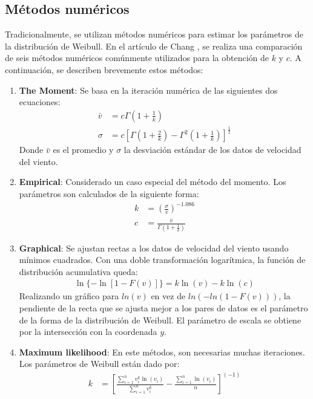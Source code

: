  \subsection{Métodos numéricos}
 Tradicionalmente, se utilizan métodos numéricos para estimar los parámetros de la distribución de Weibull. En el artículo de Chang \cite{Chang10}, se realiza una comparación de seis métodos numéricos comúnmente utilizados para la obtención de $k$ y $c$. A continuación, se describen brevemente estos métodos:
 \begin{enumerate}
     \item \textbf{The Moment}: Se basa en la iteración numérica de las siguientes dos ecuaciones:
        \begin{align}
            \bar{v} &= c\Gamma(1 + \frac{1}{k})\\
            \sigma &= c[\Gamma(1 + \frac{2}{k}) - \Gamma^2(1 + \frac{1}{k})]^{\frac{1}{2}}
        \end{align}    
        Donde $\bar{v}$ es el promedio y $\sigma$ la desviación estándar de los datos de velocidad del viento.
    \item \textbf{Empirical}: Considerado un caso especial del método del momento. Los parámetros son calculados de la siguiente forma: 
        \begin{align}
            k &= (\frac{\sigma}{\bar{v}})^{-1.086}\\
            c &= \frac{\bar{v}}{\Gamma(1 + \frac{1}{k})}
        \end{align}    
    \item \textbf{Graphical}: Se ajustan rectas a los datos de velocidad del viento usando mínimos cuadrados. Con una doble transformación logarítmica, la función de distribución acumulativa queda:
        \begin{align}
            \ln\{-\ln[1- F(v)]\} = k\ln(v) - k\ln(c)
        \end{align}    
         Realizando un gráfico para $ln(v)$ en vez de $ln(-ln(1-F(v)))$, la pendiente de la recta que se ajusta mejor a los pares de datos es el parámetro de la forma de la distribución de Weibull. El parámetro de escala se obtiene por la intersección con la coordenada $y$.  
    \item \textbf{Maximum likelihood}: En este métodos, son necesarias muchas iteraciones. Los parámetros de Weibull están dado por:
        \begin{align}
            k &= [\frac{\sum_{i=1}^n v_i^k \ln(v_i)}{\sum_{i=1}^n v_i^k} - \frac{\sum_{i=1}^n \ln(v_i)}{n}]^{(-1)}\\

\end{align}
\end{enumerate}
